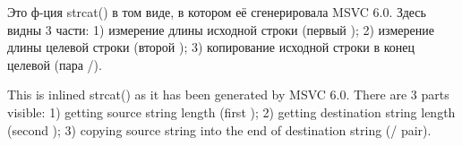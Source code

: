 
\ifdefined\RUSSIAN
Это ф-ция strcat() в том виде, в котором её сгенерировала MSVC 6.0.
Здесь видны 3 части:
1) измерение длины исходной строки (первый );
2) измерение длины целевой строки (второй );
3) копирование исходной строки в конец целевой (пара /).
\fi %

\ifdefined\ENGLISH
This is inlined strcat() as it has been generated by MSVC 6.0.
There are 3 parts visible:
1) getting source string length (first );
2) getting destination string length (second );
3) copying source string into the end of destination string (/ pair).
\fi %



